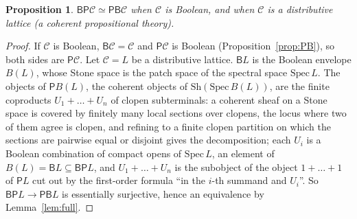 \documentclass[11pt]{amsart}
\newtheorem{prop}[thm]{Proposition}
\theoremstyle{definition}
\newcommand{\Sh}{\mathrm{Sh}}
\newcommand{\PP}{\mathsf P}
\newcommand{\BB}{\mathsf B}
\newcommand{\cC}{\mathcal C}
\begin{document}
\begin{prop}\label{prop:positive}
$\BB\PP\cC\simeq\PP\BB\cC$ when $\cC$ is Boolean, and when $\cC$ is a
distributive lattice (a coherent propositional theory).
\end{prop}
\begin{proof}
If $\cC$ is Boolean, $\BB\cC=\cC$ and $\PP\cC$ is Boolean
(Proposition~\ref{prop:PB}), so both sides are $\PP\cC$. Let $\cC=L$ be a
distributive lattice. $\BB L$ is the Boolean envelope $B(L)$, whose Stone
space is the patch space of the spectral space $\mathrm{Spec}\,L$. The
objects of $\PP B(L)$, the coherent objects of $\Sh(\mathrm{Spec}\,B(L))$,
are the finite coproducts $U_1+\dots+U_n$ of clopen subterminals: a
coherent sheaf on a Stone space is covered by finitely many local
sections over clopens, the locus where two of them agree is clopen, and
refining to a finite clopen partition on which the sections are
pairwise equal or disjoint gives the decomposition; each $U_i$ is a
Boolean combination of compact opens of $\mathrm{Spec}\,L$, an element of
$B(L)=\BB L\subseteq\BB\PP L$, and $U_1+\dots+U_n$ is the subobject of the
object $1+\dots+1$ of $\PP L$ cut out by the first-order formula ``in the
$i$-th summand and $U_i$''. So $\BB\PP L\to\PP\BB L$ is essentially
surjective, hence an equivalence by Lemma~\ref{lem:full}.
\end{proof}
\end{document}
